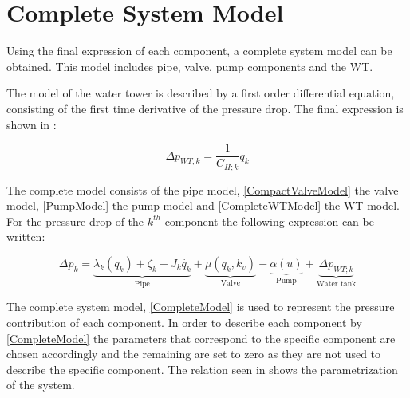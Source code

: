 \section{Complete System Model} 
\label{CompleteSystemModel}

Using the final expression of each component, a complete system model can be obtained. This model includes pipe, valve, pump components and the WT. 

The model of the water tower is described by a first order differential equation, consisting of the first time derivative of the pressure drop. The final expression is shown in :

\begin{equation}
  \label{CompleteWTModel}
  \Delta {\dot{p}_{WT;k}} = \frac{1}{C_{H;k}} q_k 
\end{equation}

The complete model consists of the pipe model, \eqref{CompactValveModel} the valve model, \eqref{PumpModel} the pump model and \eqref{CompleteWTModel} the WT model. For the pressure drop of the $k^{th}$ component the following expression can be written: 

%

\begin{equation}
\label{CompleteModel}
\Delta p_k = \underbrace{\lambda_k (q_k) + \zeta_k - J_k \dot{q_k}}_\text{Pipe} + \underbrace{\mu (q_k, k_v)}_\text{Valve} - \underbrace{\alpha (u)}_\text{Pump} + \underbrace{\Delta p_{WT;k}}_\text{Water tank}
\end{equation}

The complete system model, \eqref{CompleteModel} is used to represent the pressure contribution of each component. In order to describe each component by \eqref{CompleteModel} the parameters that correspond to the specific component are chosen accordingly and the remaining are set to zero as they are not used to describe the specific component. 
The relation seen in  shows the parametrization of the system.

